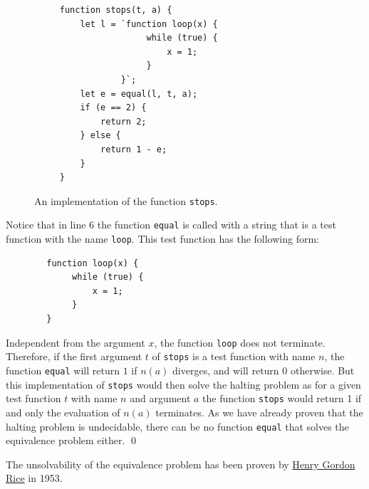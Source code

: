 \begin{figure}[!h]
  \centering
\begin{verbatim}
     function stops(t, a) {
         let l = `function loop(x) { 
                      while (true) {
                          x = 1;
                      }
                 }`;
         let e = equal(l, t, a);
         if (e == 2) {
             return 2;
         } else {
             return 1 - e;
         }
     } 
\end{verbatim}
  \vspace*{-0.3cm}
  \caption{An implementation of the function \texttt{stops}.}
  \label{fig:stops}
\end{figure}

Notice that in line 6 the function \texttt{equal} is called with a string that is a test function with the
name \texttt{loop}.
This test function has the following form:
\begin{verbatim}
        function loop(x) {
             while (true) {
                 x = 1;
             }
        }
\end{verbatim}
Independent from the argument $x$, the function \texttt{loop} does not terminate.
Therefore, if the first argument $t$ of \texttt{stops} is a test function with name $n$, 
the function \texttt{equal} will return $1$ if $n(a)$ diverges, and will return $0$ otherwise.
But this implementation of \texttt{stops} would then solve the halting problem as
for a given test function $t$ with name $n$ and argument $a$ the function \texttt{stops} would
return 1 if and only the evaluation of $n(a)$ terminates.
As we have already proven that the
halting problem is undecidable, there can be no function \texttt{equal} that solves the equivalence
problem either.
\qed

\remarkEng
The unsolvability of the equivalence problem has been proven by \href{http://en.wikipedia.org/wiki/Henry_Gordon_Rice}{Henry Gordon Rice} \cite{rice:1953} in 1953.
\eox


